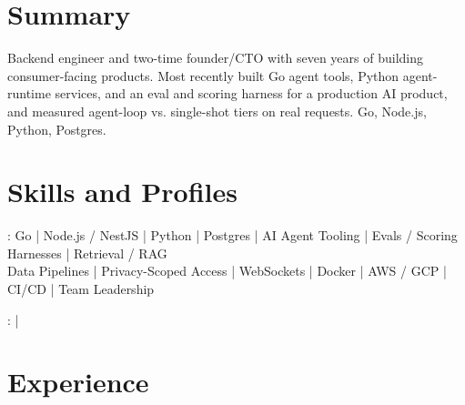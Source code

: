 \documentclass[print]{jack-resume}
\begin{document}
\pagecolor{darkmodeBackground}


\begin{minipage}[t][1cm][t]{.03\textwidth}
    \hfill
\end{minipage}

\section{Summary}
Backend engineer and two-time founder/CTO with seven years of building consumer-facing products. Most recently built Go agent tools, Python agent-runtime services, and an eval and scoring harness for a production AI product, and measured agent-loop vs. single-shot tiers on real requests. Go, Node.js, Python, Postgres.
\sectionsep

\section{Skills and Profiles}
:
Go \hfill | \hfill
Node.js / NestJS \hfill | \hfill
Python \hfill | \hfill
Postgres \hfill | \hfill
AI Agent Tooling \hfill | \hfill
Evals / Scoring Harnesses \hfill | \hfill
Retrieval / RAG \\
\hspace{1.0cm} Data Pipelines \hfill | \hfill
Privacy-Scoped Access \hfill | \hfill
WebSockets \hfill | \hfill
Docker \hfill | \hfill
AWS / GCP \hfill | \hfill
CI/CD \hfill | \hfill
Team Leadership \\

\raggedright{
    :
      \href{https://www.linkedin.com/in/jack-sturtevant/}{ \ExternalLink} |
     \href{https://github.com/jacksturt}{ \ExternalLink}}

\section{Experience}
\end{document}

